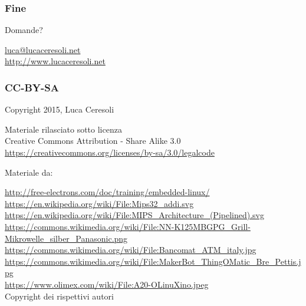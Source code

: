 \documentclass[xetex,table]{beamer}
\begin{document}
\begin{frame}
\frametitle{Fine}

  \begin{center}
    {\Huge Domande?}

    \vspace{0.1\textheight}

    \href{mailto:luca@lucaceresoli.net}{luca@lucaceresoli.net}\\
    \url{http://www.lucaceresoli.net}
  \end{center}
\end{frame}

\begin{frame}
\frametitle{CC-BY-SA}
  \begin{center}
    \textcopyright{} Copyright 2015, Luca Ceresoli\\

  \vspace{0.05\textheight}

   \small
   Materiale rilasciato sotto licenza\\
   Creative Commons Attribution - Share Alike 3.0 \\
   \url{https://creativecommons.org/licenses/by-sa/3.0/legalcode} \\
  \end{center}

  \vspace{0.05\textheight}

  Materiale da:

  \vspace{0.01\textheight}
  \begin{tiny}
    {
      \setlength{\parskip}{0cm plus0mm minus3mm}
      \fontsize{4}{0}
      \url{http://free-electrons.com/doc/training/embedded-linux/}\\
      \url{https://en.wikipedia.org/wiki/File:Mips32_addi.svg}\\
      \url{https://en.wikipedia.org/wiki/File:MIPS_Architecture_(Pipelined).svg}\\
      \url{https://commons.wikimedia.org/wiki/File:NN-K125MBGPG_Grill-Mikrowelle_silber_Panasonic.png}\\
      \url{https://commons.wikimedia.org/wiki/File:Bancomat_ATM_italy.jpg}\\
      \url{https://commons.wikimedia.org/wiki/File:MakerBot_ThingOMatic_Bre_Pettis.jpg}\\
      \url{https://www.olimex.com/wiki/File:A20-OLinuXino.jpeg}\\
      \textcopyright{} Copyright dei rispettivi autori
    }
  \end{tiny}
\end{frame}
\end{document}
